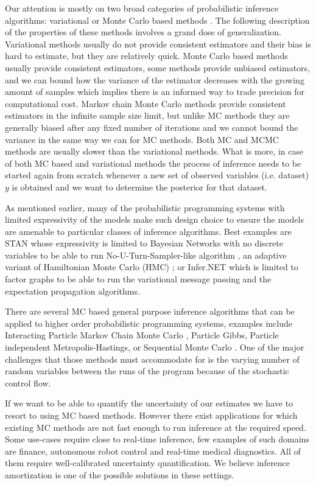 \documentclass[12pt]{article}
\begin{document}
Our attention is mostly on two broad categories of probabilistic inference algorithms: variational \citep{WainwrightJordan2008} or Monte Carlo based methods \citep{mcbook}.
The following description of the properties of these methods involves a grand dose of generalization.
Variational methods usually do not provide consistent estimators and their bias is hard to estimate, but they are relatively quick.
Monte Carlo based methods usually provide consistent estimators, some methods provide unbiased estimators, and we can bound how the variance of the estimator decreases with the growing amount of samples which implies there is an informed way to trade precision for computational cost.
Markov chain Monte Carlo methods provide consistent estimators in the infinite sample size limit, but unlike MC methods they are generally biased after any fixed number of iterations \citep{JacobEtAl2017} and we cannot bound the variance in the same way we can for MC methods.
Both MC and MCMC methods are usually slower than the variational methods.
What is more, in case of both MC based and variational methods the process of inference needs to be started again from scratch whenever a new set of observed variables (i.e. dataset) $y$ is obtained and we want to determine the posterior for that dataset.  

As mentioned earlier, many of the probabilistic programming systems with limited expressivity of the models make such design choice to ensure the models are amenable to particular classes of inference algorithms. 
Best examples are STAN whose expressivity is limited to Bayesian Networks with no discrete variables to be able to run No-U-Turn-Sampler-like algorithm \citep{NUTS}, an adaptive variant of Hamiltonian Monte Carlo (HMC) \citep{HMC}; or Infer.NET which is limited to factor graphs to be able to run the variational message passing \citep{variationalmessagepassing} and the expectation propagation \citep{EP} algorithms.

There are several MC based general purpose inference algorithms that can be applied to higher order probabilistic programming systems, examples include Interacting Particle Markov Chain Monte Carlo \citep{rainforth2016interacting}, Particle Gibbs, Particle independent Metropolis-Hastings, or Sequential Monte Carlo \citep{WoodEtAl2014}.
One of the major challenges that those methods must accommodate for is the varying number of random variables between the runs of the program because of the stochastic control flow.  

If we want to be able to quantify the uncertainty of our estimates we have to resort to using MC based methods.
However there exist applications for which existing MC methods are not fast enough to run inference at the required speed.
Some use-cases require close to real-time inference, few examples of such domains are finance, autonomous robot control and real-time medical diagnostics. 
All of them require well-calibrated uncertainty quantification.
We believe inference amortization is one of the possible solutions in these settings.
\end{document}
